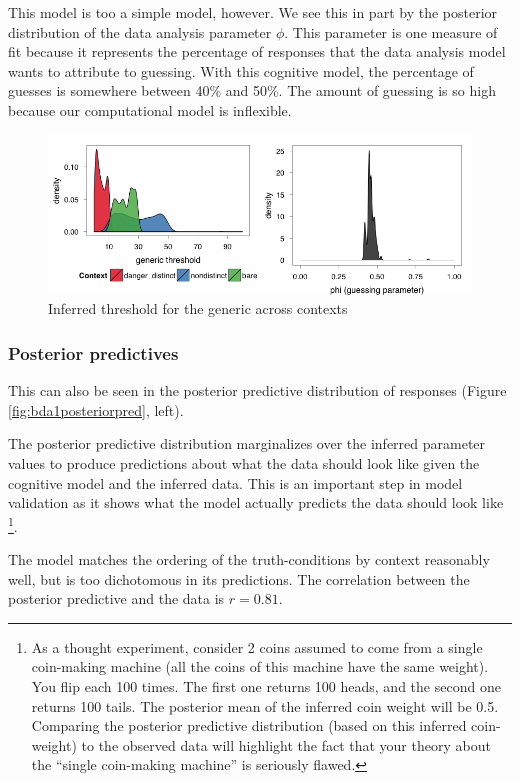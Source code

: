 \documentclass[10pt,letterpaper]{article}
\begin{document}
This model is too a simple model, however. We see this in part by the posterior distribution of the data analysis parameter $\phi$. This parameter is one measure of fit because it represents the percentage of responses that the data analysis model wants to attribute to guessing. With this cognitive model, the percentage of guesses is somewhere between 40\% and 50\%. The amount of guessing is so high because our computational model is inflexible.

\begin{figure}
\centering
    \includegraphics[width=\columnwidth]{fig2_bda1_combined}
    \caption{Inferred threshold for the generic across contexts}
  \label{fig:bda1a}
\end{figure}


\subsubsection{Posterior predictives}

This can also be seen in the posterior predictive distribution of responses (Figure \ref{fig:bda1posteriorpred}, left). 

The posterior predictive distribution marginalizes over the inferred parameter values to produce predictions about what the data should look like given the cognitive model and the inferred data. This is an important step in model validation as it shows what the model actually predicts the data should look like \footnote{As a thought experiment, consider 2 coins assumed to come from a single coin-making machine (all the coins of this machine have the same weight). You flip each 100 times. The first one returns 100 heads, and the second one returns 100 tails. The posterior mean of the inferred coin weight will be 0.5. Comparing the posterior predictive distribution (based on this inferred coin-weight) to the observed data will highlight the fact that your theory about the ``single coin-making machine'' is seriously flawed.}.

The model matches the ordering of the truth-conditions by context reasonably well, but is too dichotomous in its predictions. The correlation between the posterior predictive and the data is $r = 0.81$. 
\end{document}
